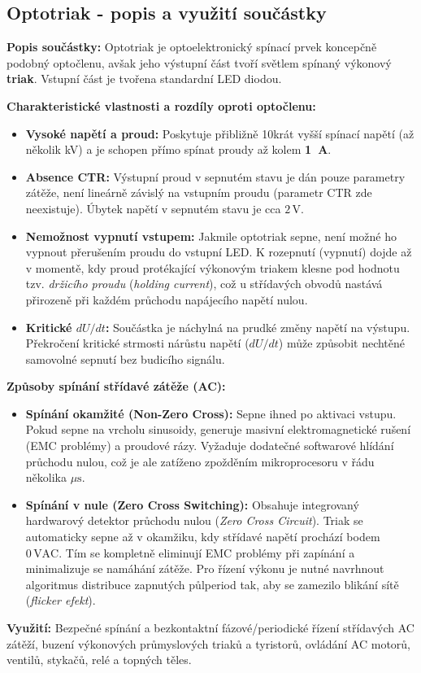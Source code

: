 \documentclass[a4paper, 12pt]{article}
\begin{document}
        \subsection{Optotriak - popis a využití součástky}
        \textbf{Popis součástky:} Optotriak je optoelektronický spínací prvek koncepčně podobný optočlenu, avšak jeho výstupní část tvoří světlem spínaný výkonový \textbf{triak}. Vstupní část je tvořena standardní LED diodou.

        \textbf{Charakteristické vlastnosti a rozdíly oproti optočlenu:}
        \begin{itemize}
            \item \textbf{Vysoké napětí a proud:} Poskytuje přibližně 10krát vyšší spínací napětí (až několik kV) a je schopen přímo spínat proudy až kolem \textbf{1~A}.
            \item \textbf{Absence CTR:} Výstupní proud v sepnutém stavu je dán pouze parametry zátěže, není lineárně závislý na vstupním proudu (parametr CTR zde neexistuje). Úbytek napětí v sepnutém stavu je cca $2\,\text{V}$.
            \item \textbf{Nemožnost vypnutí vstupem:} Jakmile optotriak sepne, není možné ho vypnout přerušením proudu do vstupní LED. K rozepnutí (vypnutí) dojde až v momentě, kdy proud protékající výkonovým triakem klesne pod hodnotu tzv. \textit{držicího proudu} (\textit{holding current}), což u střídavých obvodů nastává přirozeně při každém průchodu napájecího napětí nulou.
            \item \textbf{Kritické $dU/dt$:} Součástka je náchylná na prudké změny napětí na výstupu. Překročení kritické strmosti nárůstu napětí ($dU/dt$) může způsobit nechtěné samovolné sepnutí bez budicího signálu.
        \end{itemize}

        \textbf{Způsoby spínání střídavé zátěže (AC):}
        \begin{itemize}
            \item \textbf{Spínání okamžité (Non-Zero Cross):} Sepne ihned po aktivaci vstupu. Pokud sepne na vrcholu sinusoidy, generuje masivní elektromagnetické rušení (EMC problémy) a proudové rázy. Vyžaduje dodatečné softwarové hlídání průchodu nulou, což je ale zatíženo zpožděním mikroprocesoru v řádu několika $\mu\text{s}$.
            \item \textbf{Spínání v nule (Zero Cross Switching):} Obsahuje integrovaný hardwarový detektor průchodu nulou (\textit{Zero Cross Circuit}). Triak se automaticky sepne až v okamžiku, kdy střídavé napětí prochází bodem $0\,\text{VAC}$. Tím se kompletně eliminují EMC problémy při zapínání a minimalizuje se namáhání zátěže. Pro řízení výkonu je nutné navrhnout algoritmus distribuce zapnutých půlperiod tak, aby se zamezilo blikání sítě (\textit{flicker efekt}).
        \end{itemize}
        \textbf{Využití:} Bezpečné spínání a bezkontaktní fázové/periodické řízení střídavých AC zátěží, buzení výkonových průmyslových triaků a tyristorů, ovládání AC motorů, ventilů, stykačů, relé a topných těles.
\end{document}
